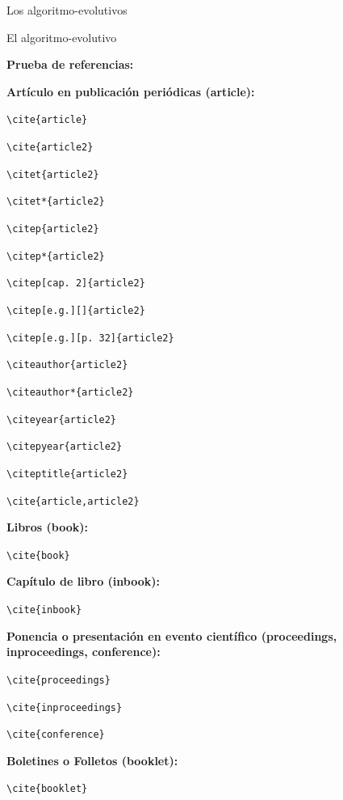 Los \glspl{algoritmo-evolutivo}

El \gls{algoritmo-evolutivo}

\hacerglosario

\break

\espaciodoble\textbf{Prueba de referencias:}

\textbf{Artículo en publicación periódicas (article):}

\verb;\cite{article}; \cite{article}

\verb;\cite{article2}; \cite{article2}

\verb;\citet{article2}; \citet{article2}

\verb;\citet*{article2}; \citet*{article2}

\verb;\citep{article2}; \citep{article2}

\verb;\citep*{article2}; \citep*{article2}

\verb;\citep[cap. 2]{article2}; \citep[cap. 2]{article2}

\verb;\citep[e.g.][]{article2}; \citep[e.g.][]{article2}

\verb;\citep[e.g.][p. 32]{article2}; \citep[e.g.][p. 32]{article2}

\verb;\citeauthor{article2}; \citeauthor{article2}

\verb;\citeauthor*{article2}; \citeauthor*{article2}

\verb;\citeyear{article2}; \citeyear{article2}

\verb;\citepyear{article2}; 

\verb;\citeptitle{article2}; 

\verb;\cite{article,article2}; \cite{article,article2}

\espaciodoble\textbf{Libros (book):}

\verb;\cite{book}; \cite{book}

\espaciodoble\textbf{Capítulo de libro (inbook):}

\verb;\cite{inbook}; \cite{inbook}

\espaciodoble\textbf{Ponencia o presentación en evento científico (proceedings, inproceedings, conference):}

\verb;\cite{proceedings}; \cite{proceedings}

\verb;\cite{inproceedings}; \cite{inproceedings}

\verb;\cite{conference}; \cite{conference}

\espaciodoble\textbf{Boletines o Folletos (booklet):}

\verb;\cite{booklet}; \cite{booklet}

